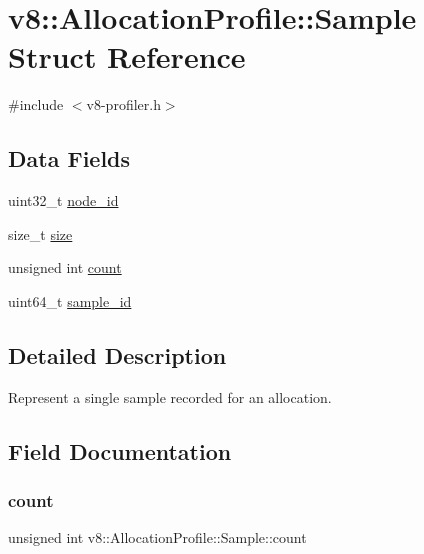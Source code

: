 \hypertarget{structv8_1_1AllocationProfile_1_1Sample}{}\section{v8\+:\+:Allocation\+Profile\+:\+:Sample Struct Reference}
\label{structv8_1_1AllocationProfile_1_1Sample}


{\ttfamily \#include $<$v8-\/profiler.\+h$>$}

\subsection*{Data Fields}
\begin{DoxyCompactItemize}
\item 
uint32\+\_\+t \mbox{\hyperlink{structv8_1_1AllocationProfile_1_1Sample_ab84cfd942c2b6d42f25874b5008cfc35}{node\+\_\+id}}
\item 
size\+\_\+t \mbox{\hyperlink{structv8_1_1AllocationProfile_1_1Sample_aa8775ce782c6fcc5a20922f604190dd5}{size}}
\item 
unsigned int \mbox{\hyperlink{structv8_1_1AllocationProfile_1_1Sample_a0c121684db4adc4e4757b85d919bb0e7}{count}}
\item 
uint64\+\_\+t \mbox{\hyperlink{structv8_1_1AllocationProfile_1_1Sample_afc21641115d4a9684363ac873750422c}{sample\+\_\+id}}
\end{DoxyCompactItemize}


\subsection{Detailed Description}
Represent a single sample recorded for an allocation. 

\subsection{Field Documentation}
\mbox{\label{structv8_1_1AllocationProfile_1_1Sample_a0c121684db4adc4e4757b85d919bb0e7}} 
\subsubsection{\texorpdfstring{count}{count}}
{\footnotesize\ttfamily unsigned int v8\+::\+Allocation\+Profile\+::\+Sample\+::count}

